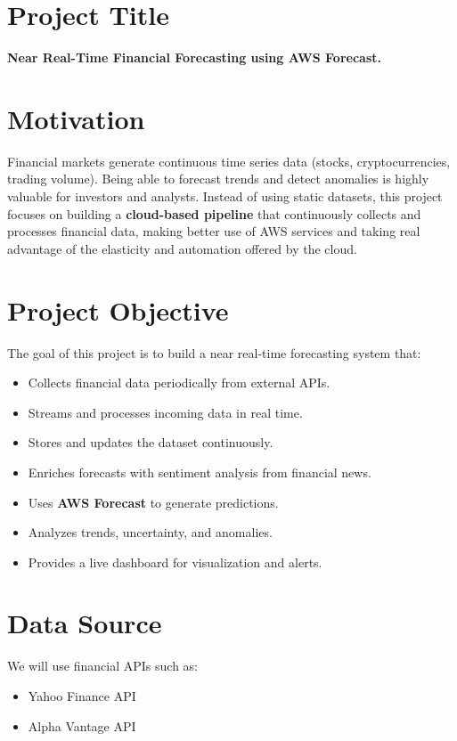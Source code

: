 \documentclass[a4paper,12pt]{article}
\begin{document}
\setcounter{section}{0}
\setcounter{subsection}{0}

\clearpage

\section{Project Title}
\textbf{Near Real-Time Financial Forecasting using AWS Forecast.}

\section{Motivation}
Financial markets generate continuous time series data (stocks, cryptocurrencies, trading volume).
Being able to forecast trends and detect anomalies is highly valuable for investors and analysts.
Instead of using static datasets, this project focuses on building a \textbf{cloud-based pipeline} that continuously collects and processes financial data, making better use of AWS services and taking real advantage of the elasticity and automation offered by the cloud.

\section{Project Objective}
The goal of this project is to build a near real-time forecasting system that:
\begin{itemize}[leftmargin=1.2em]
    \item Collects financial data periodically from external APIs.
    \item Streams and processes incoming data in real time.
    \item Stores and updates the dataset continuously.
    \item Enriches forecasts with sentiment analysis from financial news.
    \item Uses \textbf{AWS Forecast} to generate predictions.
    \item Analyzes trends, uncertainty, and anomalies.
    \item Provides a live dashboard for visualization and alerts.
\end{itemize}

\section{Data Source}
We will use financial APIs such as:
\begin{itemize}[leftmargin=1.2em]
    \item Yahoo Finance API
    \item Alpha Vantage API
\end{itemize}
\end{document}
